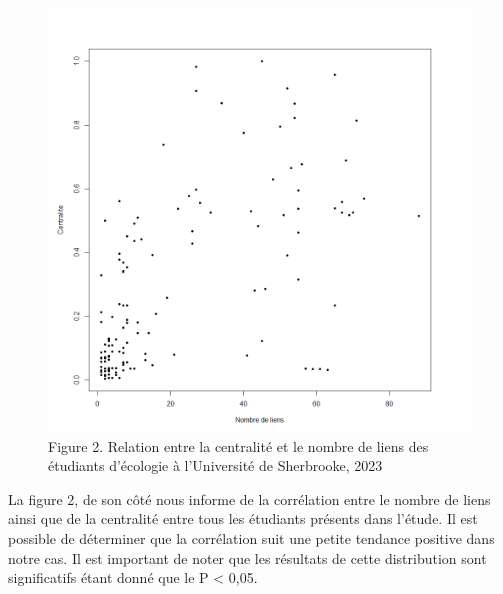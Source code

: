 \documentclass[
]{article}
\begin{document}
\begin{figure}
\centering
\includegraphics{images/ncollab_centralite.png}
\caption{Figure 2. Relation entre la centralité et le nombre de liens
des étudiants d'écologie à l'Université de Sherbrooke, 2023}
\end{figure}

La figure 2, de son côté nous informe de la corrélation entre le nombre
de liens ainsi que de la centralité entre tous les étudiants présents
dans l'étude. Il est possible de déterminer que la corrélation suit une
petite tendance positive dans notre cas. Il est important de noter que
les résultats de cette distribution sont significatifs étant donné que
le P \textless{} 0,05.
\end{document}
